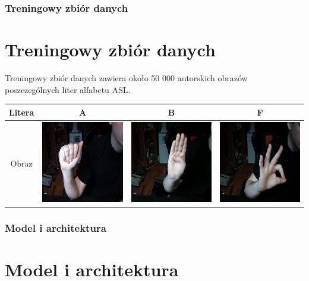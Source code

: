 \documentclass{beamer}
\begin{document}
	\begin{frame}
		\frametitle{Treningowy zbiór danych}
		\section{Treningowy zbiór danych}
		Treningowy zbiór danych zawiera około 50 000 autorskich obrazów poszczególnych liter alfabetu ASL.
		\begin{center}
			\begin{tabular}{c|c|c|c}
				Litera & A & B & F \\
				\hline
				Obraz &
				\includegraphics[scale=0.4]{1} &
				\includegraphics[scale=0.4]{2} &
				\includegraphics[scale=0.4]{3}
			\end{tabular}
			
		\end{center}
	\end{frame}

	\begin{frame}
		\frametitle{Model i architektura}
		\section{Model i architektura}
		\begin{center}
			
		\end{center}
	\end{frame}
\end{document}
